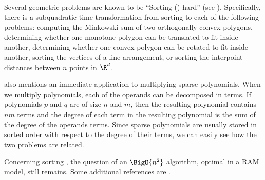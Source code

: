 Several geometric problems are known to be ``Sorting-(\XY)-hard'' (see
\citet*{barrera1996finding,barequet2001polygon}). Specifically, there
is a subquadratic-time transformation from sorting \XY to each of the
following problems: computing the Minkowski sum of two orthogonally-convex
polygons, determining whether one monotone polygon can be translated to fit
inside another, determining whether one convex polygon can be rotated to fit
inside another, sorting the vertices of a line arrangement, or sorting the
interpoint distances between $n$ points in $\R^d$.

\citet*{fredman:1976} also mentions an immediate application to multiplying
sparse polynomials. When we multiply polynomials, each of the
operands can be decomposed in terms. If polynomials $p$ and $q$ are of size $n$
and $m$, then the resulting polynomial contains $nm$ terms and the degree of
each term in the resulting polynomial is the sum of the degree of the operands
terms. Since sparse polynomials are usually stored in sorted order with respect
to the degree of their terms, we can easily see how the two problems are
related.

Concerning sorting \XY, the question of an \(\BigO{n^2}\) algorithm, optimal
in a RAM model, still
remains. Some additional references are \citet*{
harper:1975,
kahn:1995,
dietzfelbinger1989lower,
steiger1995pseudo,
lambert:1990,
erickson:1999,
bremner2012necklaces,
orourke:2012:sortxy}.
